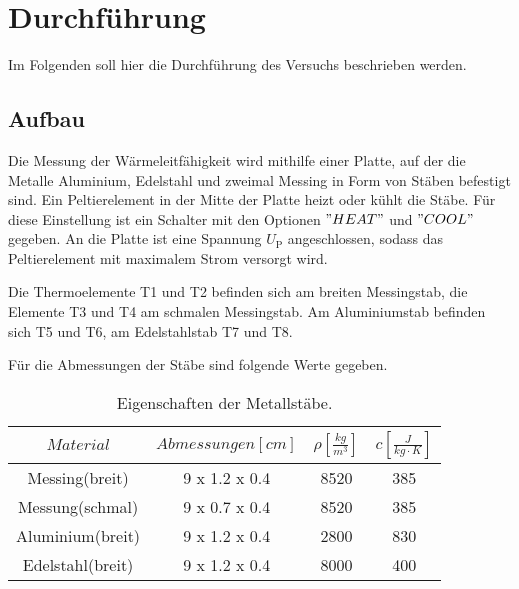 \section{Durchführung} \label{sec:durchführung}

Im Folgenden soll hier die Durchführung des Versuchs beschrieben werden.

\subsection{Aufbau}

    Die Messung der Wärmeleitfähigkeit wird mithilfe einer Platte, auf der die Metalle
    Aluminium, Edelstahl und zweimal Messing in Form von Stäben befestigt sind.
    Ein Peltierelement in der Mitte der Platte heizt oder kühlt die Stäbe.
    Für diese Einstellung ist ein Schalter mit den Optionen $"HEAT"$ und $"COOL"$ gegeben.
    An die Platte ist eine Spannung $U_\text{P}$ angeschlossen, sodass das Peltierelement mit maximalem
    Strom versorgt wird.
    

    Die Thermoelemente T1 und T2 befinden sich am breiten Messingstab, die Elemente
    T3 und T4 am schmalen Messingstab.
    Am Aluminiumstab befinden sich T5 und T6, am Edelstahlstab T7 und T8.
   
    Für die Abmessungen der Stäbe sind folgende Werte gegeben.
    \begin{table}
        \centering
        \caption{Eigenschaften der Metallstäbe.}
        \label{tab:vorgegebeneDaten}
        \begin{tabular}{c c c c}
            \toprule
            $Material$ & $Abmessungen[cm]$ & $\rho [\frac{kg}{m^3}]$ & $c [\frac{J}{kg \cdot K}]$ \\
            \midrule
            Messing(breit) & 9 x 1.2 x 0.4 & 8520 & 385 \\
            Messung(schmal) & 9 x 0.7 x 0.4 & 8520 & 385 \\
            Aluminium(breit) & 9 x 1.2 x 0.4 & 2800 & 830 \\
            Edelstahl(breit) & 9 x 1.2 x 0.4 & 8000 & 400 \\
            \bottomrule
        \end{tabular}
    \end{table}

